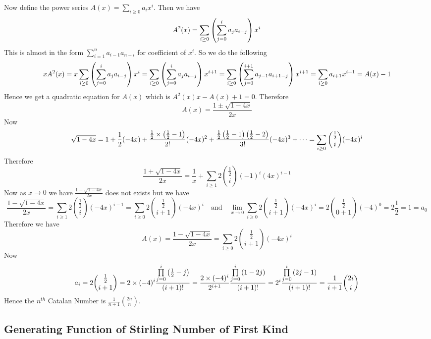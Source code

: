 \documentclass[twoside]{article}
\begin{document}
Now define the power series $A(x)=\sum\limits_{i\geq 0}a_ix^i$. Then we have $$A^2(x)=\sum_{i\geq 0}\left( \sum_{j=0}^ia_ja_{i-j} \right)x^i$$This is almost in the form $\sum\limits_{i=1}^n a_{i-1}a_{n-i}$ for coefficient of $x^i$. So we do the following $$xA^2(x)=x\sum_{i\geq 0}\left( \sum_{j=0}^ia_ja_{i-j} \right)x^i=\sum_{i\geq 0}\left( \sum_{j=0}^ia_ja_{i-j} \right)x^{i+1}=\sum_{i\geq 0}\left( \sum_{j=1}^{i+1}a_{j-1}a_{i+1-j} \right)x^{i+1}=\sum_{i\geq 0}a_{i+1}x^{i+1}=A(x)-1$$
Hence we get a quadratic equation for $A(x)$ which is $A^2(x)x-A(x)+1=0$. Therefore $$A(x)=\frac{1\pm\sqrt{1-4x}}{2x}$$Now $$\sqrt{1-4x}=1+\frac12(-4x)+\frac{\frac12\times \left(\frac12-1\right)}{2!}(-4x)^2+\frac{\frac12\left(\frac12-1\right)\left(\frac12-2\right)}{3!}(-4x)^3+\cdots=\sum_{i\geq 0}\binom{\frac12}{i}(-4x)^i$$Therefore $$\frac{1+\sqrt{1-4x}}{2x}= \frac1x+\sum_{i\geq 1}2\binom{\frac12}{i}(-1)^{i}(4x)^{i-1} $$Now as $x\to 0$ we have  $\frac{1+\sqrt{1-4x}}{2x}$ does not exists but we have $$\frac{1-\sqrt{1-4x}}{2x}=\sum_{i\geq 1}2\binom{\frac12}{i}(-4x)^{i-1}=\sum_{i\geq 0}2\binom{\frac12}{i+1}(-4x)^{i}\quad \text{and}\quad \lim_{x\to 0}\sum_{i\geq 0}2\binom{\frac12}{i+1}(-4x)^{i}=2\binom{\frac12}{0+1}(-4)^{0}=2\frac12=1=a_0$$Therefore we have $$A(x)=\frac{1-\sqrt{1-4x}}{2x}=\sum_{i\geq 0}2\binom{\frac12}{i+1}(-4x)^{i}$$Now $$a_i=2\binom{\frac12}{i+1}=2\times (-4)^i\frac{\prod\limits_{j=0}^i \left(\frac12-j\right)}{(i+1)!}=\frac{2\times (-4)^i}{2^{i+1}}\frac{\prod\limits_{j=0}^i \left(1-2j\right)}{(i+1)!}= 2^i\frac{\prod\limits_{j=0}^i \left(2j-1\right)}{(i+1)!}=\frac1{i+1}\binom{2i}{i}$$Hence the $n^{th}$ Catalan Number is $\frac{1}{n+1}\binom{2n}n$. 

\subsection{Generating Function of Stirling Number of First Kind}
\end{document}
